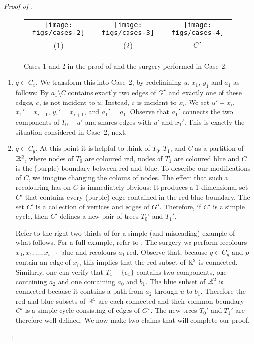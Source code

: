 \documentclass{patmorin}
\newcommand{\dual}[1]{{#1}^\star}
\begin{document}
\begin{proof}[Proof of ]
\begin{figure}
   \begin{center}
     \begin{tabular}{ccc}
       \texttt{[image: figs/cases-2]} &
       \texttt{[image: figs/cases-3]} &
       \texttt{[image: figs/cases-4]} \\
       (1) & (2) & $C'$
     \end{tabular}
   \end{center}
   \caption{Cases 1 and 2 in the proof of  and the surgery performed in Case~2.}
\end{figure}
\begin{enumerate}
   \item $q\subset C_x$.  We transform this into Case~2, by redefinining $u$, $x_1$, $y_1$ and $a_1$ as follows:  By  $a_1\setminus C$ contains exactly two edges of $\dual{G}$ and exactly one of these edges, $e$, is not incident to $u$. Instead, $e$ is incident to $x_i$.  We set $u'=x_i$, $x_1'=x_{i-1}$, $y_1'=x_{i+1}$, and $a_1'=a_1$. Observe that $a_1'$ connects the two components of $T_0-u'$ and shares edges with $u'$ and $x_1'$. This is exactly the situation considered in Case~2, next.

   \item $q\subset C_y$.  At this point it is helpful to think of $T_0$, $T_1$, and $C$ as a partition of $\mathbb{R}^2$, where nodes of $T_0$ are coloured red, nodes of $T_1$ are coloured blue and $C$ is the (purple) boundary between red and blue.  To describe our modifications of $C$, we imagine changing the colours of nodes.  The effect that such a recolouring has on $C$ is immediately obvious: It produces a 1-dimensional set $C'$ that contains every (purple) edge contained in the red-blue boundary. The set $C'$ is a collection of vertices and edges of $\dual{G}$. Therefore, if $C'$ is a simple cycle, then $C'$ defines a new pair of trees $T_0'$ and $T_1'$.


   Refer to the right two thirds of  for a simple
   (and misleading) example of what follows. For a full example,
   refer to .  The surgery we perform recolours
   $x_0,x_1,\ldots,x_{i-1}$ blue and recolours $a_1$ red.  Observe that,
   because $q\subset C_y$ and $p$ contain an edge of $x_i$, this implies
   that the red subset of $\mathbb{R}^2$ is connected. Similarly, one can verify that $T_1-\{a_1\}$ contains two components, one containing $a_2$ and one containing $a_0$ and $b_1$.  The blue subset of $\mathbb{R}^2$ is connected because it contains a path from $a_2$ through $u$ to $b_1$.  Therefore the red and blue subsets of $\mathbb{R}^2$ are each connected and their common boundary $C'$ is a simple cycle consisting of edges of $\dual{G}$.  The new trees $T_0'$
   and $T_1'$ are therefore well defined.  We now make two claims that
   will complete our proof.


\end{enumerate}
\end{proof}
\end{document}
